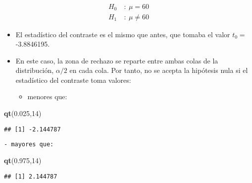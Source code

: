 \documentclass[]{article}
\newenvironment{Shaded}{\begin{snugshade}}{\end{snugshade}}
\newcommand{\KeywordTok}[1]{\textcolor[rgb]{0.13,0.29,0.53}{\textbf{#1}}}
\newcommand{\DecValTok}[1]{\textcolor[rgb]{0.00,0.00,0.81}{#1}}
\newcommand{\FloatTok}[1]{\textcolor[rgb]{0.00,0.00,0.81}{#1}}
\newcommand{\NormalTok}[1]{#1}
\providecommand{\tightlist}{%
  \setlength{\itemsep}{0pt}\setlength{\parskip}{0pt}}
\begin{document}
\[
\begin{align}
H_0 \ & : \ \mu = 60 \\
H_1 \ & : \ \mu \neq 60
\end{align}
\]

\begin{itemize}
\item
  El estadístico del contraste es el mismo que antes, que tomaba el
  valor \(t_0=\) -3.8846195.
\item
  En este caso, la zona de rechazo se reparte entre ambas colas de la
  distribución, \(\alpha/2\) en cada cola. Por tanto, no se acepta la
  hipótesis nula si el estadístico del contraste toma valores:

  \begin{itemize}
  \tightlist
  \item
    menores que:
  \end{itemize}
\end{itemize}

\begin{Shaded}
\begin{Highlighting}[]
\KeywordTok{qt}\NormalTok{(}\FloatTok{0.025}\NormalTok{,}\DecValTok{14}\NormalTok{)}
\end{Highlighting}
\end{Shaded}

\begin{verbatim}
## [1] -2.144787
\end{verbatim}

\begin{verbatim}
- mayores que:
\end{verbatim}

\begin{Shaded}
\begin{Highlighting}[]
\KeywordTok{qt}\NormalTok{(}\FloatTok{0.975}\NormalTok{,}\DecValTok{14}\NormalTok{)}
\end{Highlighting}
\end{Shaded}

\begin{verbatim}
## [1] 2.144787
\end{verbatim}
\end{document}
